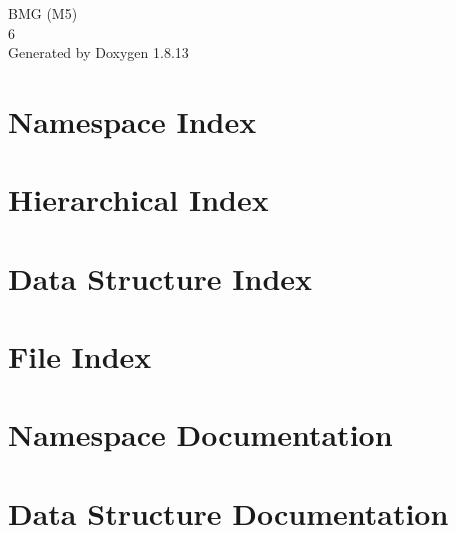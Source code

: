 \documentclass[twoside]{book}
\newcommand{\+}{\discretionary{\mbox{\scriptsize$\hookleftarrow$}}{}{}}
\newcommand{\clearemptydoublepage}{%
  \newpage{\pagestyle{empty}\cleardoublepage}%
}
\begin{document}
\hypersetup{pageanchor=false,
             bookmarksnumbered=true,
             pdfencoding=unicode
            }
\begin{titlepage}
\vspace*{7cm}
\begin{center}%
{\Large B\+MG (M5) \\[1ex]\large 6 }\\
\vspace*{1cm}
{\large Generated by Doxygen 1.8.13}\\
\end{center}
\end{titlepage}
\clearemptydoublepage
{}
\tableofcontents
\clearemptydoublepage
{}
\hypersetup{pageanchor=true}

\chapter{Namespace Index}

\chapter{Hierarchical Index}

\chapter{Data Structure Index}

\chapter{File Index}

\chapter{Namespace Documentation}

\chapter{Data Structure Documentation}




















\end{document}

